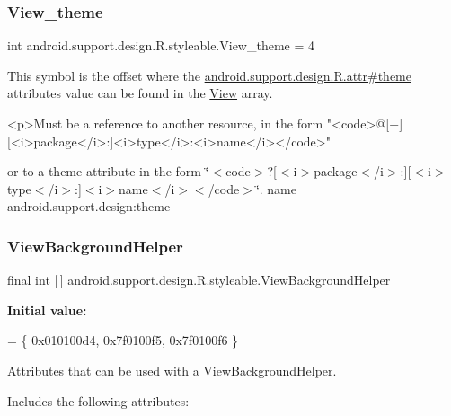 \subsubsection{\texorpdfstring{View\+\_\+theme}{View\_theme}}
{\footnotesize\ttfamily int android.\+support.\+design.\+R.\+styleable.\+View\+\_\+theme = 4\hspace{0.3cm}{\ttfamily [static]}}

This symbol is the offset where the \hyperlink{classandroid_1_1support_1_1design_1_1R_1_1attr_a10605d4e34fb129fb634f376dda78853}{android.\+support.\+design.\+R.\+attr\#theme} attribute\textquotesingle{}s value can be found in the \hyperlink{classandroid_1_1support_1_1design_1_1R_1_1styleable_ae848bcf5b638b9248537d28ebf90c67f}{View} array.

\begin{DoxyVerb}      <p>Must be a reference to another resource, in the form "<code>@[+][<i>package</i>:]<i>type</i>:<i>name</i></code>"
\end{DoxyVerb}
 or to a theme attribute in the form \char`\"{}$<$code$>$?\mbox{[}$<$i$>$package$<$/i$>$\+:\mbox{]}\mbox{[}$<$i$>$type$<$/i$>$\+:\mbox{]}$<$i$>$name$<$/i$>$$<$/code$>$\char`\"{}.  name android.\+support.\+design\+:theme \mbox{\label{classandroid_1_1support_1_1design_1_1R_1_1styleable_a7df8d9542168fb1f80021c7e5b776ddb}} 
\subsubsection{\texorpdfstring{View\+Background\+Helper}{ViewBackgroundHelper}}
{\footnotesize\ttfamily final int \mbox{[}$\,$\mbox{]} android.\+support.\+design.\+R.\+styleable.\+View\+Background\+Helper\hspace{0.3cm}{\ttfamily [static]}}

{\bfseries Initial value\+:}
\begin{DoxyCode}
= \{
            0x010100d4, 0x7f0100f5, 0x7f0100f6
        \}
\end{DoxyCode}
Attributes that can be used with a View\+Background\+Helper. 

Includes the following attributes\+:

